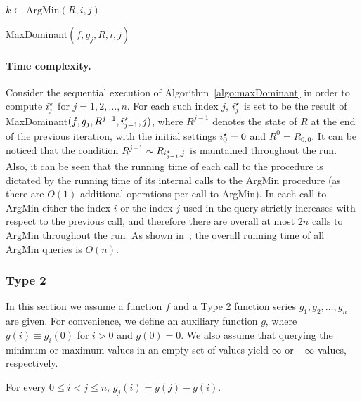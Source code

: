 \begin{algorithm}
	$k \gets \text{ArgMin}(R, i, j)$\;
	\;
	\caption{MaxDominant$(f, g_j, R, i, j)$}
	\label{algo:maxDominant}
\end{algorithm}


\paragraph{Time complexity.}
Consider the sequential execution of Algorithm~\ref{algo:maxDominant} in order to compute $\optIx$ for $j = 1, 2, \ldots, n$. For each such index $j$, $\optIx$ is set to be the result of MaxDominant$(f, g_j, R^{j-1}, \optIx[j-1], j)$, where $R^{j-1}$ denotes the state of $R$ at the end of the previous iteration, with the initial settings $\optIx[0] = 0$ and $R^0 = R_{0, 0}$. It can be noticed that the condition $R^{j-1} \sim R_{\optIx[j-1], j}$ is maintained throughout the run. Also, it can be seen that the running time of each call to the procedure is dictated by the running time of its internal calls to the ArgMin procedure (as there are $O(1)$ additional operations per call to ArgMin). In each call to ArgMin either the index $i$ or the index $j$ used in the query strictly increases with respect to the previous call, and therefore there are overall at most $2n$ calls to ArgMin throughout the run. As shown in~\cite{lee2007simple}, the overall running time of all ArgMin queries is $O(n)$.


\subsubsection{Type 2}
\label{sec:type2}
In this section we assume a function $f$ and a Type 2 function series $g_1, g_2, \ldots, g_n$ are given. For convenience, we define an auxiliary function $g$, where $g(i) \equiv g_i(0)$ for $i > 0$ and $g(0) = 0$. We also assume that querying the minimum or maximum values in an empty set of values yield $\infty$ or $-\infty$ values, respectively.

\begin{claim}
\label{clm:type_2}
	For every $0 \leq i < j \leq n$, $g_j(i) = g(j) - g(i)$.
\end{claim} 

